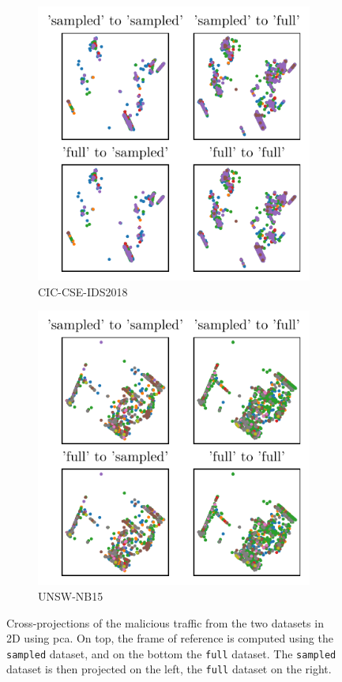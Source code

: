 \begin{figure}
  \begin{subfigure}{.45\linewidth}
    \centering
    \includegraphics{figures/cicids/pca-projection.pdf}
    \caption{CIC-CSE-IDS2018\label{fig:assess.pca.cicids}}
  \end{subfigure}
  \hfill
  \begin{subfigure}{.45\linewidth}
    \centering
    \includegraphics{figures/nb15/pca-projection.pdf}
    \caption{UNSW-NB15\label{fig:assess.pca.nb15}}
  \end{subfigure}
  \caption{
    Cross-projections of the malicious traffic from the two datasets in 2D using \gls{pca}.
    On top, the frame of reference is computed using the \texttt{sampled} dataset, and on the bottom the \texttt{full} dataset.
    The \texttt{sampled} dataset is then projected on the left, the \texttt{full} dataset on the right.
    }
  \label{fig:assess.pca}
\end{figure}

